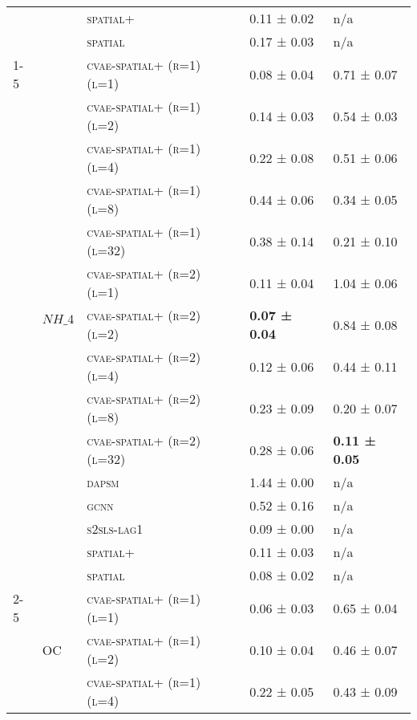 \documentclass{article}
\begin{document}
\begin{table}[!tbp]
\begin{tabular}{lllll}
 &  & \textsc{spatial+} & 0.11 ± {\small 0.02} & n/a \\
 &  & \textsc{spatial} & 0.17 ± {\small 0.03} & n/a \\
\cline{1-5} \cline{2-5}
\multirow[t]{30}{*}{$ (LC)\; SO\_{4} \;\to\; PM\_{2.5}\; (r=1) $} & \multirow[t]{15}{*}{$ NH\_{4} $} & \textsc{cvae-\textsc{spatial+} (r=1) (l=1)} & 0.08 ± {\small 0.04} & 0.71 ± {\small 0.07} \\
 &  & \textsc{cvae-\textsc{spatial+} (r=1) (l=2)} & 0.14 ± {\small 0.03} & 0.54 ± {\small 0.03} \\
 &  & \textsc{cvae-\textsc{spatial+} (r=1) (l=4)} & 0.22 ± {\small 0.08} & 0.51 ± {\small 0.06} \\
 &  & \textsc{cvae-\textsc{spatial+} (r=1) (l=8)} & 0.44 ± {\small 0.06} & 0.34 ± {\small 0.05} \\
 &  & \textsc{cvae-\textsc{spatial+} (r=1) (l=32)} & 0.38 ± {\small 0.14} & 0.21 ± {\small 0.10} \\
 &  & \textsc{cvae-\textsc{spatial+} (r=2) (l=1)} & 0.11 ± {\small 0.04} & 1.04 ± {\small 0.06} \\
 &  & \textsc{cvae-\textsc{spatial+} (r=2) (l=2)} & \bf 0.07 ± {\small 0.04} & 0.84 ± {\small 0.08} \\
 &  & \textsc{cvae-\textsc{spatial+} (r=2) (l=4)} & 0.12 ± {\small 0.06} & 0.44 ± {\small 0.11} \\
 &  & \textsc{cvae-\textsc{spatial+} (r=2) (l=8)} & 0.23 ± {\small 0.09} & 0.20 ± {\small 0.07} \\
 &  & \textsc{cvae-\textsc{spatial+} (r=2) (l=32)} & 0.28 ± {\small 0.06} & \bf 0.11 ± {\small 0.05} \\
 &  & \textsc{dapsm} & 1.44 ± {\small 0.00} & n/a \\
 &  & \textsc{gcnn} & 0.52 ± {\small 0.16} & n/a \\
 &  & \textsc{s2sls-lag1} & 0.09 ± {\small 0.00} & n/a \\
 &  & \textsc{spatial+} & 0.11 ± {\small 0.03} & n/a \\
 &  & \textsc{spatial} & 0.08 ± {\small 0.02} & n/a \\
\cline{2-5}
 & \multirow[t]{15}{*}{OC} & \textsc{cvae-\textsc{spatial+} (r=1) (l=1)} & 0.06 ± {\small 0.03} & 0.65 ± {\small 0.04} \\
 &  & \textsc{cvae-\textsc{spatial+} (r=1) (l=2)} & 0.10 ± {\small 0.04} & 0.46 ± {\small 0.07} \\
 &  & \textsc{cvae-\textsc{spatial+} (r=1) (l=4)} & 0.22 ± {\small 0.05} & 0.43 ± {\small 0.09} \\

\end{tabular}
\end{table}
\end{document}
